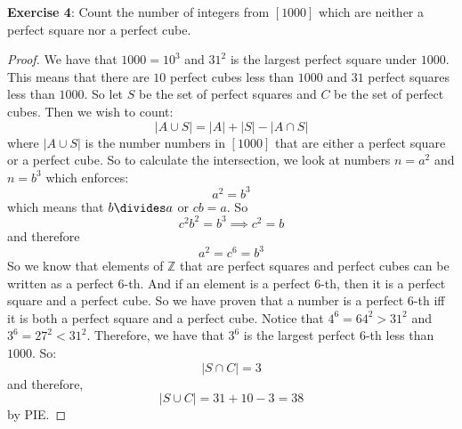 \documentclass{article}
\begin{document}
\textbf{Exercise 4}: Count the number of integers from $[1000]$ which are neither a perfect square nor a perfect cube.
    \begin{proof}
        We have that $1000 = 10^{3}$ and $31^{2}$ is the largest perfect square under $1000$. This means that there are $10$ perfect cubes less than $1000$ and $31$ perfect squares less than $1000$. So let $S$ be the set of perfect squares and $C$ be the set of perfect cubes. Then we wish to count:
            \begin{equation*}
                \lvert A \cup S \rvert = \lvert A \rvert + \lvert S \rvert - \lvert A \cap S \rvert
            \end{equation*}
        where $\lvert A \cup S \rvert$ is the number numbers in $[1000]$ that are either a perfect square or a perfect cube. So to calculate the intersection, we look at numbers $n = a^{2}$ and $n = b^{3}$ which enforces:
            \begin{equation*}
                a^{2} = b^{3}
            \end{equation*}
        which means that $b \divides a$ or $cb = a$. So
            \begin{equation*}
                c^{2}b^{2} = b^{3} \implies c^{2} = b
            \end{equation*}
        and therefore
            \begin{equation*}
                a^{2} = c^{6} = b^{3}
            \end{equation*}
        So we know that elements of $\mathbb{Z}$ that are perfect squares and perfect cubes can be written as a perfect $6$-th. And if an element is a perfect 6-th, then it is a perfect square and a perfect cube. So we have proven that a number is a perfect 6-th iff it is both a perfect square and a perfect cube. Notice that $4^{6} = 64^{2} > 31^{2}$ and $3^{6} = 27^{2} < 31^{2}$. Therefore, we have that $3^{6}$ is the largest perfect $6$-th less than $1000$. So:
            \begin{equation*}
                \lvert S \cap C \rvert = 3
            \end{equation*}
        and therefore,
            \begin{equation*}
                \lvert S \cup C \rvert = 31 + 10 - 3 = 38
            \end{equation*}
        by PIE.
    \end{proof}
\end{document}
